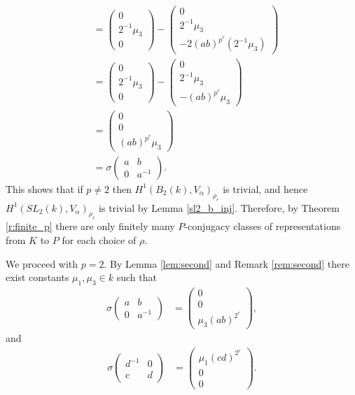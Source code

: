 \begin{align*}
	&=
	\left(\begin{matrix}0\\2^{-1}\mu_3\\0\end{matrix}\right)
	-
	\left(\begin{matrix}0\\2^{-1}\mu_3\\-2(ab)^{p^r} (2^{-1}\mu_3)\end{matrix}\right) \\
	&=\left(\begin{matrix}0\\2^{-1}\mu_3\\0\end{matrix}\right)
	-\left(\begin{matrix}0\\2^{-1}\mu_3\\-(ab)^{p^r}\mu_3\end{matrix}\right) \\
	&=\left(\begin{matrix}0\\0\\(ab)^{p^r}\mu_3\end{matrix}\right) \\
	&= \sigma\left(\begin{matrix}a & b\\0 & a^{-1}\end{matrix}\right).
\end{align*}
This shows that if $p\neq 2$ then $H^1(B_2(k), V_\alpha)_{\rho_r}$ is trivial, and hence $H^1(SL_2(k), V_\alpha)_{\rho_r}$ is trivial by Lemma \ref{sl2_b_inj}.
Therefore, by Theorem \ref{r:finite_p} there are only finitely many $P$-conjugacy classes of representations from $K$ to $P$ for each choice of $\rho$.

We proceed with $p=2$.
By Lemma \ref{lem:second} and Remark \ref{rem:second} there exist constants $\mu_1,\mu_3\in k$ such that
	\begin{align*}
	\sigma
			\left(\begin{matrix}a & b \\ 0 & a^{-1}\end{matrix}\right)
	&=
	\left(\begin{matrix}0 \\ 0 \\ \mu_3(ab)^{2^r}\end{matrix}\right),
	\end{align*}
and 
\begin{align*}
	\sigma\left(\begin{matrix}d^{-1} & 0 \\ c & d\end{matrix}\right)
	&=
	\left(\begin{matrix}\mu_1(cd)^{2^r}\\0\\0\end{matrix}\right).
	\end{align*}
	
